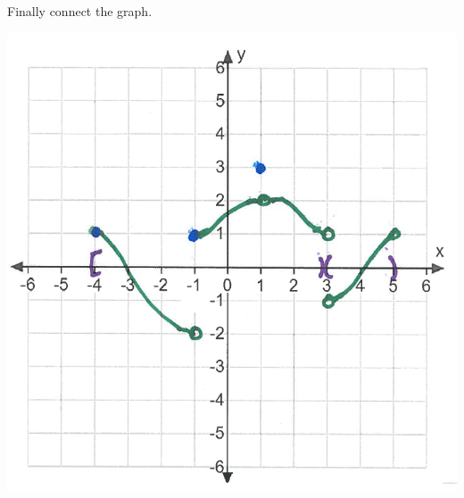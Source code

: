 \documentclass[nooutcomes,handout]{ximera}
\begin{document}
\begin{problem}
\begin{freeResponse}
	Finally connect the graph.
	    \begin{image}
	\includegraphics[scale=.5]{"Sketching stage 4"}
	    \end{image}
	\end{freeResponse}
\end{problem}
	
	
	
	
\end{document}
